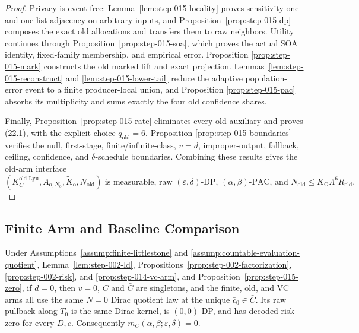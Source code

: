 \begin{proof}
Privacy is event-free: Lemma~\ref{lem:step-015-locality} proves
sensitivity one and one-list adjacency on arbitrary inputs, and
Proposition~\ref{prop:step-015-dp} composes the exact old allocations and
transfers them to raw neighbors. Utility continues through
Proposition~\ref{prop:step-015-soa}, which proves the actual SOA identity,
fixed-family membership, and empirical error. Proposition
\ref{prop:step-015-mark} constructs the old marked lift and exact
projection. Lemmas~\ref{lem:step-015-reconstruct} and
\ref{lem:step-015-lower-tail} reduce the adaptive population-error event to
a finite producer-local union, and Proposition
\ref{prop:step-015-pac} absorbs its multiplicity and sums exactly the four
old confidence shares.

Finally, Proposition~\ref{prop:step-015-rate} eliminates every old
auxiliary and proves (22.1), with the explicit choice
\(q_{\mathrm{old}}=6\). Proposition
\ref{prop:step-015-boundaries} verifies the null, first-stage,
finite/infinite-class, \(v=d\), improper-output, fallback, ceiling,
confidence, and \(\delta\)-schedule boundaries. Combining these results
gives the old-arm interface
\[
\boxed{
(K_C^{\mathrm{old\text{-}Lyu}},
A_{\mathrm o,N_{\mathrm o}},
\widetilde K_{\mathrm o},
N_{\mathrm{old}})
\text{ is measurable, raw }(\varepsilon,\delta)\text{-DP, }
(\alpha,\beta)\text{-PAC, and }
N_{\mathrm{old}}\le K_{\mathrm O}\Lambda^6R_{\mathrm{old}}.}
\]



\end{proof}

\subsection{Finite Arm and Baseline Comparison}\label{app:step_016}


 \begin{proposition}\label{prop:step-016-zero}
Under Assumptions~\ref{assump:finite-littlestone} and
\ref{assump:countable-evaluation-quotient}, Lemma~\ref{lem:step-002-ld}, 
Propositions~\ref{prop:step-002-factorization},
\ref{prop:step-002-risk}, and
\ref{prop:step-014-vc-arm}, and Proposition~\ref{prop:step-015-zero}, if \(d=0\), then \(v=0\),
\(C\) and \(\bar C\) are singletons, and the finite, old, and VC arms all
use the same \(N=0\) Dirac quotient law at the unique
\(\bar c_0\in\bar C\). Its raw pullback along \(T_0\) is the same Dirac
kernel, is \((0,0)\)-DP, and has decoded risk zero for every \(D,c\).
Consequently \(m_C(\alpha,\beta;\varepsilon,\delta)=0\).


\end{proposition}


